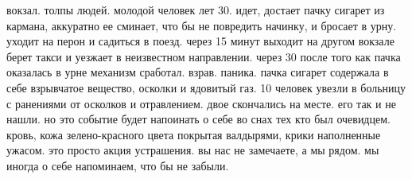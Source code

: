 вокзал. толпы людей. молодой человек лет 30. идет, достает пачку сигарет
из кармана, аккуратно ее сминает, что бы не повредить начинку, и бросает
в урну. уходит на перон и садиться в поезд.
через 15 минут выходит на другом вокзале берет такси и уезжает в неизвестном направлении.
через 30 после того как пачка оказалась в урне механизм сработал. взрав.
паника. пачка сигарет содержала в себе взрывчатое вещество, осколки
и ядовитый газ. 10 человек увезли в больницу с ранениями от осколков и
отравлением. двое скончались на месте. его так и не нашли. но это
событие будет  напоинать о себе во снах тех кто был очевидцем. кровь,
кожа зелено-красного цвета покрытая валдырями, крики наполненные ужасом.
это просто акция устрашения. вы нас не замечаете, а мы рядом. мы иногда
о себе напоминаем, что бы не забыли.
